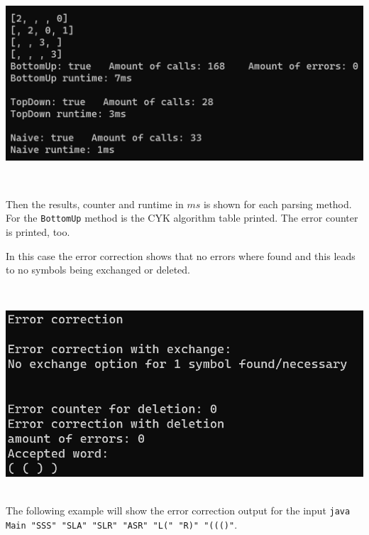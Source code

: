 \documentclass[a4paper, 11pt]{article}
\newcommand{\dq}{"}
\begin{document}
\begin{minipage}{0.6\textwidth}
\includegraphics[scale=0.6]{images/terminal_2.png}
\end{minipage}\begin{minipage}{0.1\textwidth}
\ 
\end{minipage}\begin{minipage}{0.3\textwidth}
Then the results, counter and runtime in $ms$ is shown for each parsing method. \\
For the \texttt{BottomUp} method is the CYK algorithm table printed.
The error counter is printed, too.
\end{minipage}

\begin{minipage}{0.35\textwidth}
In this case the error correction shows that no errors where found and this leads to no symbols being exchanged or deleted.

\end{minipage}\begin{minipage}{0.1\textwidth}
\ 
\end{minipage}\begin{minipage}{0.55\textwidth}
\includegraphics[scale=0.7]{images/terminal_3.png}
\end{minipage}

\ \\
The following example will show the error correction output for the input \texttt{java Main \dq SSS\dq \ \dq SLA\dq \ \dq SLR\dq \ \dq ASR\dq \ \dq L(\dq \ \dq R)\dq\  \dq ((()\dq}. \\
\end{document}
